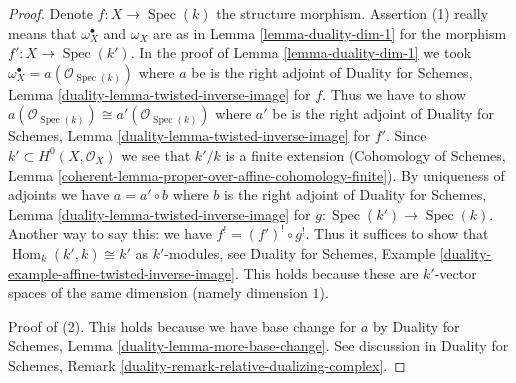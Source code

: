 \documentclass[10pt,a4paper]{amsart}
\theoremstyle{plain}
\theoremstyle{definition}
\theoremstyle{remark}
\numberwithin{equation}{subsection}
\def\Spec{\mathop{\mathrm{Spec}}}
\def\Hom{\mathop{\mathrm{Hom}}\nolimits}
\begin{document}
\begin{proof}
Denote $f : X \to \Spec(k)$ the structure morphism.
Assertion (1) really means that $\omega_X^\bullet$ and $\omega_X$
are as in Lemma \ref{lemma-duality-dim-1} for the morphism
$f' : X \to \Spec(k')$. In the proof of Lemma \ref{lemma-duality-dim-1}
we took $\omega_X^\bullet = a(\mathcal{O}_{\Spec(k)})$
where $a$ be is the right adjoint of
Duality for Schemes, Lemma
\ref{duality-lemma-twisted-inverse-image} for $f$.
Thus we have to show
$a(\mathcal{O}_{\Spec(k)}) \cong a'(\mathcal{O}_{\Spec(k)})$
where $a'$ be is the right adjoint of
Duality for Schemes, Lemma
\ref{duality-lemma-twisted-inverse-image} for $f'$.
Since $k' \subset H^0(X, \mathcal{O}_X)$ we see that $k'/k$ is a finite
extension (Cohomology of Schemes, Lemma
\ref{coherent-lemma-proper-over-affine-cohomology-finite}).
By uniqueness of adjoints we have $a = a' \circ b$ where
$b$ is the right adjoint of Duality for Schemes, Lemma
\ref{duality-lemma-twisted-inverse-image} for $g : \Spec(k') \to \Spec(k)$.
Another way to say this: we have $f^! = (f')^! \circ g^!$.
Thus it suffices to show that $\Hom_k(k', k) \cong k'$ as
$k'$-modules, see Duality for Schemes, Example
\ref{duality-example-affine-twisted-inverse-image}.
This holds because these are $k'$-vector spaces of
the same dimension (namely dimension $1$).

\medskip\noindent
Proof of (2). This holds because we have base change for $a$ by
Duality for Schemes, Lemma \ref{duality-lemma-more-base-change}.
See discussion in Duality for Schemes, Remark
\ref{duality-remark-relative-dualizing-complex}.
\end{proof}
\end{document}
